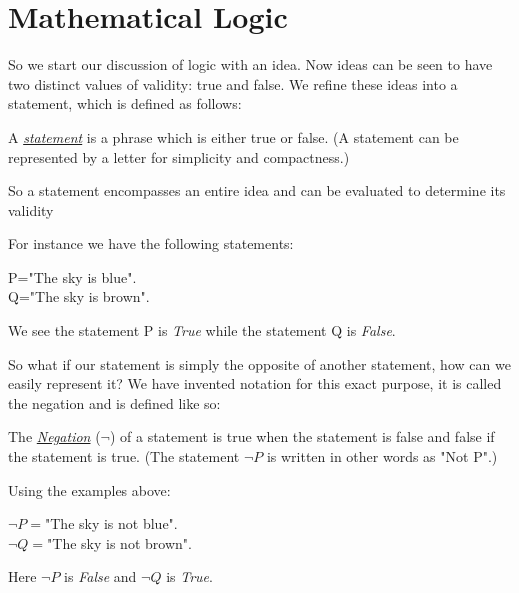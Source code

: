 \section{Mathematical Logic}

So we start our discussion of logic with an idea.
Now ideas can be seen to have two distinct values of validity: true and false.
We refine these ideas into a statement, which is defined as follows:

\begin{defn}
    \label{defn:statement}
	A \underline{\emph{statement}} is a phrase which is either true or false. (A statement can be represented by a letter for simplicity and compactness.)
\end{defn}

So a statement encompasses an entire idea and can be evaluated to determine its validity

\begin{ex}
    For instance we have the following statements:
	\begin{center}
    P="The sky is blue".\\
	Q="The sky is brown".
    \end{center}
    We see the statement P is \emph{True} while the statement Q is \emph{False}.
\end{ex}

So what if our statement is simply the opposite of another statement, how can we easily represent it?
We have invented notation for this exact purpose, it is called the negation and is defined like so:

\begin{defn}
	The \underline{\emph{Negation}} ($\neg$) of a statement is true when the statement is false and false if the statement is true.
	(The statement $\neg P$ is written in other words as "Not P".)
\end{defn}

\begin{ex}
    Using the examples above:
    \begin{center}
	$\neg P=$"The sky is not blue".\\
	$\neg Q=$"The sky is not brown".
    \end{center}
    Here $\neg P$ is \emph{False} and $\neg Q$ is \emph{True}.
\end{ex}

